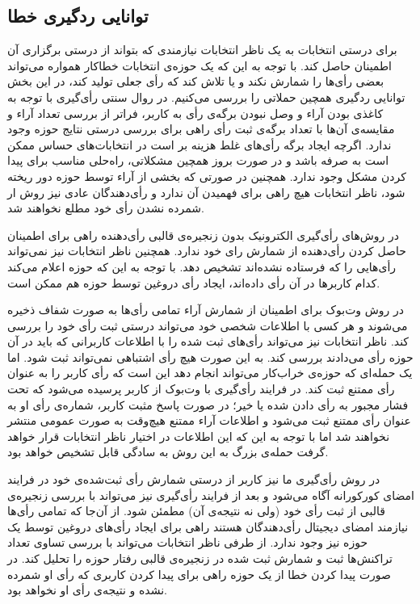 \subsection{توانایی ردگیری خطا}
برای درستی انتخابات به یک ناظر انتخابات نیازمندی که بتواند از درستی برگزاری آن اطمینان حاصل کند. با توجه به این که یک حوزه‌ی انتخابات خطاکار همواره می‌تواند بعضی رأی‌ها را شمارش نکند و یا تلاش کند که رأی جعلی تولید کند، در این بخش توانایی ردگیری همچین حملاتی را بررسی می‌کنیم.
در روال سنتی رأی‌گیری با توجه به کاغذی بودن آراء و وصل نبودن برگه‌ی رأی به کاربر، فراتر از بررسی تعداد آراء و مقایسه‌ی آن‌ها با تعداد برگه‌ی ثبت رأی راهی برای بررسی درستی نتایج حوزه وجود ندارد. اگرچه ایجاد برگه‌ رأی‌های غلط هزینه بر است در انتخابات‌های حساس ممکن است به صرفه باشد و در صورت بروز همچین مشکلاتی، راه‌حلی مناسب برای پیدا کردن مشکل وجود ندارد. همچنین در صورتی که بخشی از آراء توسط حوزه دور ریخته شود، ناظر انتخابات هیچ راهی برای فهمیدن آن ندارد و رأی‌دهندگان عادی نیز روش ار شمرده نشدن رأی خود مطلع نخواهند شد.
\par 
در روش‌های رأی‌گیری الکترونیک بدون زنجیره‌ی قالبی  رأی‌دهنده راهی برای اطمینان حاصل کردن رأی‌‌دهنده از شمارش رای خود ندارد. همچنین ناظر انتخابات نیز نمی‌تواند رأی‌هایی را که فرستاده نشده‌اند تشخیص دهد. با توجه به این که حوزه اعلام می‌کند کدام کاربرها در آن رأی داده‌اند، ایجاد رأی دروغین توسط حوزه هم ممکن است. 
\par 
در روش‌ وت‌بوک برای اطمینان از شمارش آراء تمامی رأی‌ها به صورت شفاف ذخیره می‌شوند و هر کسی با اطلاعات شخصی خود می‌تواند درستی ثبت رأی خود را بررسی کند. ناظر انتخابات نیز می‌تواند رأی‌های ثبت شده را با اطلاعات کاربرانی که باید در آن حوزه رأی می‌دادند بررسی کند. به این صورت هیچ رأی اشتباهی نمی‌تواند ثبت شود. اما یک حمله‌ای که حوزه‌ی خراب‌کار می‌تواند انجام دهد این است که رأی کاربر را به عنوان رأی ممتنع ثبت کند. در فرایند رأی‌گیری با وت‌بوک از کاربر پرسیده می‌شود که تحت فشار مجبور به رأی دادن شده یا خیر؛ در صورت پاسخ مثبت کاربر، شماره‌ی رأی او به عنوان رأی ممتنع ثبت می‌شود و اطلاعات آراء ممتنع هیچ‌وقت به صورت عمومی منتشر نخواهند شد اما با توجه به این که این اطلاعات در اختیار ناظر انتخابات قرار خواهد گرفت حمله‌‌ی بزرگ به این روش به سادگی قابل تشخیص خواهد بود. 
\par 
در روش رأی‌گیری ما نیز کاربر از درستی شمارش رأی‌ ثبت‌شده‌ی خود در فرایند امضای کورکورانه آگاه می‌شود و بعد از فرایند رأی‌گیری نیز می‌تواند با بررسی زنجیره‌ی قالبی از ثبت رأی‌ خود (ولی نه نتیجه‌ی آن) مطمئن شود. از آن‌جا که تمامی رأی‌ها نیازمند امضای دیجیتال رأی‌دهندگان هستند راهی برای ایجاد رأی‌های دروغین توسط یک حوزه نیز وجود ندارد. از طرفی ناظر انتخابات می‌تواند با بررسی تساوی تعداد تراکنش‌ها ثبت و شمارش ثبت شده در زنجیره‌ی قالبی رفتار حوزه را تحلیل کند. در صورت پیدا کردن خطا از یک حوزه راهی برای پیدا کردن کاربری که رأی او شمرده نشده و نتیجه‌ی رأی او نخواهد بود.



